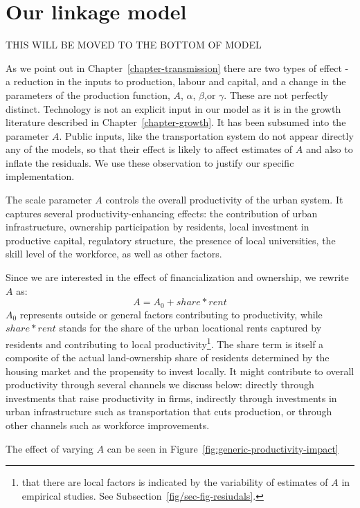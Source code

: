 


 
\section{Our linkage model}

THIS WILL BE MOVED TO THE BOTTOM OF MODEL

As we point out in Chapter~\ref{chapter-transmission} there are two types of effect - a reduction in the inputs to production, labour and capital, and a change in the parameters of the production function, $A$, $\alpha$, $\beta$,or $\gamma$.  These are not perfectly distinct. Technology is not an explicit input in our model as it is in the growth literature described in Chapter~\ref{chapter-growth}. It has been subsumed into the parameter $A$. Public inputs, like the transportation system do not appear directly any of the models, so that their effect is likely to affect estimates of $A$ and also to  inflate the residuals. We  use these observation to justify our specific implementation. 

The scale parameter $A$ controls the overall productivity of the urban system. It captures several productivity-enhancing effects: the contribution of urban infrastructure, ownership participation by residents, local investment in productive capital, regulatory structure, the presence of local universities, the skill level of the workforce, as well as other factors. 

Since we are interested in the effect of financialization and ownership, we rewrite $A$ as:
\[ A= A_0 + share * rent\]
$A_0$ represents outside or general factors contributing to productivity, while $share*rent$ stands for the share of the urban locational rents captured by residents and contributing to local productivity\footnote{that there are local factors is indicated by the variability of estimates of $A$ in empirical studies. See Subsection~\ref{fig/sec-fig-resiudals}.}. The share term is itself a composite of the actual land-ownership share of residents determined by the housing market and the propensity to invest locally.  It might contribute to overall productivity through several channels we discuss below:  directly through investments that raise productivity in firms, indirectly through investments in urban infrastructure such as transportation that cuts production, or through other channels such as workforce improvements. 

The effect of varying $A$ can be seen in Figure~\ref{fig:generic-productivity-impact}  


